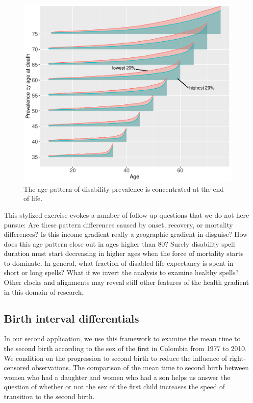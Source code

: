 \documentclass[a4paper,left=1.25cm,right=1.25cm,top=1.25cm,bottom=1.25cm]{article}
\begin{document}
\begin{figure}
    \centering
    \includegraphics[scale=.6]{Figures/App1_macro3.pdf}
    \caption{The age pattern of disability prevalence is concentrated at the end of life. }
    \label{fig:a1m3}
\end{figure}

This stylized exercise evokes a number of follow-up questions that we do not here pursue: Are these pattern differences caused by onset, recovery, or mortality differences? Is this income gradient really a geographic gradient in disguise? How does this age pattern close out in ages higher than 80? Surely disability spell duration must start decreasing in higher ages when the force of mortality starts to dominate. In general, what fraction of disabled life expectancy is spent in short or long spells? What if we invert the analysis to examine healthy spells? Other clocks and alignments may reveal still other features of the health gradient in this domain of research.

\FloatBarrier
\subsection{Birth interval differentials}

 In our second application, we use this framework to examine the mean time to the second birth according to the sex of the first in Colombia from 1977 to 2010. We condition on the progression to second birth to reduce the influence of right-censored observations. The comparison of the mean time to second birth between women who had a daughter and women who had a son helps us answer the question of whether or not the sex of the first child increases the speed of transition to the second birth. 
 
\end{document}
